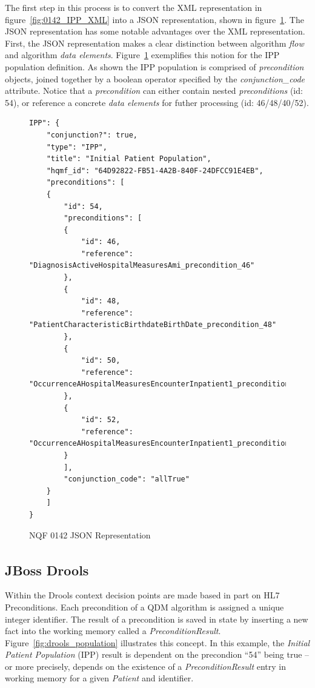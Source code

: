 \documentclass{amia}
\begin{document}
The first step in this process is to convert the XML representation in figure~\ref{fig:0142_IPP_XML} into a JSON representation, shown in figure~\ref{fig:0142_IPP_JSON}. The JSON representation has some notable advantages over the XML representation. First, the JSON representation makes a clear distinction between algorithm \textit{flow} and algorithm \textit{data elements}. Figure~\ref{fig:0142_IPP_JSON} exemplifies this notion for the IPP population definition. As shown the IPP population is comprised of \textit{precondition} objects, joined together by a boolean operator specified by the \textit{conjunction\_code} attribute. Notice that a \textit{precondition} can either contain nested \textit{preconditions} (id: 54), or reference a concrete \textit{data elements} for futher processing (id: 46/48/40/52).


\begin{figure}[H]
\begin{verbatim}
IPP": {
    "conjunction?": true,
    "type": "IPP",
    "title": "Initial Patient Population",
    "hqmf_id": "64D92822-FB51-4A2B-840F-24DFCC91E4EB",
    "preconditions": [
    {
        "id": 54,
        "preconditions": [
        {
            "id": 46,
            "reference": "DiagnosisActiveHospitalMeasuresAmi_precondition_46"
        },
        {
            "id": 48,
            "reference": "PatientCharacteristicBirthdateBirthDate_precondition_48"
        },
        {
            "id": 50,
            "reference": "OccurrenceAHospitalMeasuresEncounterInpatient1_precondition_50"
        },
        {
            "id": 52,
            "reference": "OccurrenceAHospitalMeasuresEncounterInpatient1_precondition_52"
        }
        ],
        "conjunction_code": "allTrue"
    }
    ]
}
\end{verbatim}
\caption{NQF 0142 JSON Representation} 
\label{fig:0142_IPP_JSON}
\end{figure}


\subsection*{JBoss{\textsuperscript{\textregistered}} Drools}
Within the Drools context decision points are made based in part on HL7 Preconditions. Each precondition of a QDM algorithm is assigned a unique integer identifier. The result of a precondition is saved in state by inserting a new fact into the working memory called a \textit{PreconditionResult}.  Figure~\ref{fig:drools_population} illustrates this concept. In this example, the \textit{Initial Patient Population} (IPP) result is dependent on the precondion ``54'' being true -- or more precisely, depends on the existence of a \textit{PreconditionResult} entry in working memory for a given \textit{Patient} and identifier.
\end{document}
